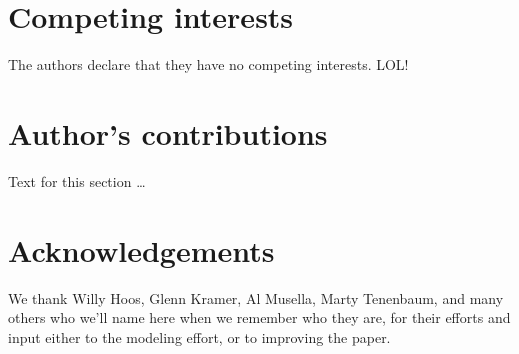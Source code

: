 \documentclass[twocolumn]{bmcart}%
\begin{document}
\begin{backmatter}


\section*{Competing interests}
  The authors declare that they have no competing interests. LOL!

\section*{Author's contributions}
    Text for this section \ldots

\section*{Acknowledgements}

We thank Willy Hoos, Glenn Kramer, Al Musella, Marty Tenenbaum, and
many others who we'll name here when we remember who they are, for
their efforts and input either to the modeling effort, or to improving
the paper.


\nocite{label}



\end{backmatter}
\end{document}
